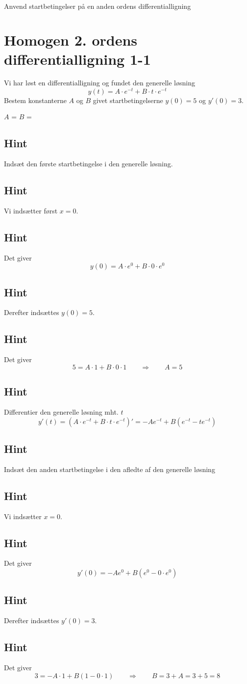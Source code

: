 \documentclass{article}
\newenvironment{exercise}[1]{\newpage\section{#1}}{}
\newcommand{\answerbox}[1]{\fbox{$#1$}}
\newcommand{\hint}{\subsection*{Hint}}
\begin{document}
Anvend startbetingelser på en anden ordens differentialligning
\tableofcontents
\newpage


\begin{exercise}{Homogen 2. ordens differentialligning 1-1}

Vi har løst en differentialligning og fundet den generelle løsning
\[
y(t) = A \cdot e^{-t} + B \cdot t \cdot e^{-t}
\]
Bestem konstanterne $A$ og $B$ givet startbetingelserne $y(0)=5$ og $y'(0)=3$.


$A$ = \answerbox{5}		$B$ = \answerbox{8}

\hint

Indsæt den første startbetingelse i den generelle løsning. 


\hint

Vi indsætter først $x=0$.

\hint

Det giver
\[
y(0)=  A \cdot e^{0} + B \cdot 0 \cdot e^{0}
\]

\hint

Derefter indsættes $y(0)=5$.

\hint 

Det giver 
\[
5 = A \cdot 1 + B \cdot 0 \cdot 1 \qquad \Rightarrow \qquad A = 5
\]

\hint 

Differentier den generelle løsning mht. $t$
\[
y'(t)= \left(A \cdot e^{-t} + B \cdot t \cdot e^{-t} \right)' = -A e^{-t} + B \left( e^{-t} - t e^{-t} \right)
\]

\hint 

Indsæt den anden startbetingelse i den afledte af den generelle løsning

\hint

Vi indsætter $x=0$.

\hint 

Det giver
\[
y'(0) = -A e^{0} + B \left( e^{0} - 0 \cdot e^{0} \right)
\]

\hint 

Derefter indsættes $y'(0)=3$.

\hint

Det giver
\[
3 = -A \cdot 1 + B \left(1- 0 \cdot 1 \right) \qquad \Rightarrow \qquad B = 3 + A = 3 + 5 = 8
\]






\end{exercise}

\newpage
\end{document}
